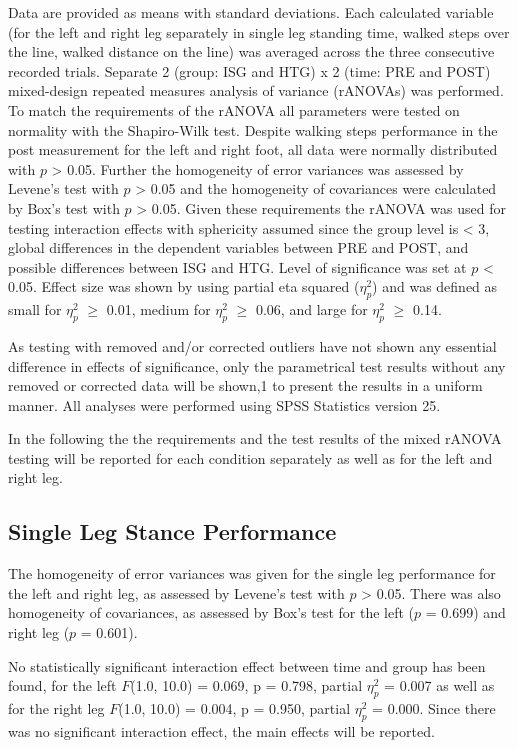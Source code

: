 Data are provided as means with standard deviations.
Each calculated variable (for the left and right leg separately in single leg standing time, walked steps over the line, walked distance on the line) was averaged across the three consecutive recorded trials.
Separate 2 (group: ISG and HTG) x 2 (time: PRE and POST) mixed-design repeated measures analysis of variance (rANOVAs) was performed.
To match the requirements of the rANOVA all parameters were tested on normality with the Shapiro-Wilk test.
Despite walking steps performance in the post measurement for the left and right foot, all data were normally distributed with $p$ > 0.05.
Further the homogeneity of error variances was assessed by Levene's test with $p$ > 0.05 and the homogeneity of covariances were calculated by Box's test with $p$ > 0.05.
Given these requirements the rANOVA was used for testing interaction effects with sphericity assumed since the group level is < 3, global differences in the dependent variables between PRE and POST, and possible differences between ISG and HTG.
Level of significance was set at $p$ < 0.05.
Effect size was shown by using partial eta squared ($\eta_{p}^{2}$) and was defined as small for $\eta_{p}^{2}$ $\geq$ 0.01, medium for $\eta_{p}^{2}$ $\geq$ 0.06, and large for $\eta_{p}^{2}$ $\geq$ 0.14.

As testing with removed and/or corrected outliers have not shown any essential difference in effects of significance, only the parametrical test results without any removed or corrected data will be shown,1 to present the results in a uniform manner.
All analyses were performed using SPSS Statistics version 25.

In the following the the requirements and the test results of the mixed rANOVA testing will be reported for each condition separately as well as for the left and right leg.

\subsection{Single Leg Stance Performance}
The homogeneity of error variances was given for the single leg performance for the left and right leg, as assessed by Levene's test with $p$ > 0.05.
There was also homogeneity of covariances, as assessed by Box's test for the left ($p$ = 0.699) and right leg ($p$ = 0.601).

No statistically significant interaction effect between time and group has been found, for the left $F$(1.0, 10.0) = 0.069, p = 0.798, partial $\eta_{p}^{2}$ = 0.007 as well as for the right leg $F$(1.0, 10.0) = 0.004, p = 0.950, partial $\eta_{p}^{2}$ = 0.000.
Since there was no significant interaction effect, the main effects will be reported.

